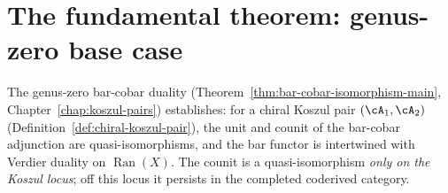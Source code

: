 \section{The fundamental theorem: genus-zero base case}
\label{sec:fundamental-theorem-koszul}

\begin{remark}
\label{rem:theorem-a-summary}
The genus-zero bar-cobar duality
(Theorem~\ref{thm:bar-cobar-isomorphism-main},
Chapter~\ref{chap:koszul-pairs}) establishes:
for a chiral Koszul pair $(\cA_1, \cA_2)$
(Definition~\ref{def:chiral-koszul-pair}),
the unit and counit of the bar-cobar adjunction are
quasi-isomorphisms, and the bar functor is intertwined
with Verdier duality on $\operatorname{Ran}(X)$.
The counit is a quasi-isomorphism \emph{only on the
Koszul locus}; off this locus it persists in the completed
coderived category.
\end{remark}

